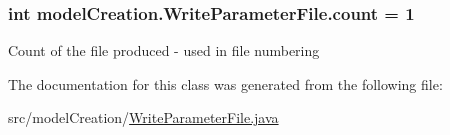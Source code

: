 \subsubsection[{count}]{\setlength{\rightskip}{0pt plus 5cm}int model\+Creation.\+Write\+Parameter\+File.\+count = 1\hspace{0.3cm}{\ttfamily [static]}}\label{classmodelCreation_1_1WriteParameterFile_ac295de06582595b7730fef191ec801b9}
Count of the file produced -\/ used in file numbering 

The documentation for this class was generated from the following file\+:\begin{DoxyCompactItemize}
\item 
src/model\+Creation/\hyperlink{WriteParameterFile_8java}{Write\+Parameter\+File.\+java}\end{DoxyCompactItemize}
